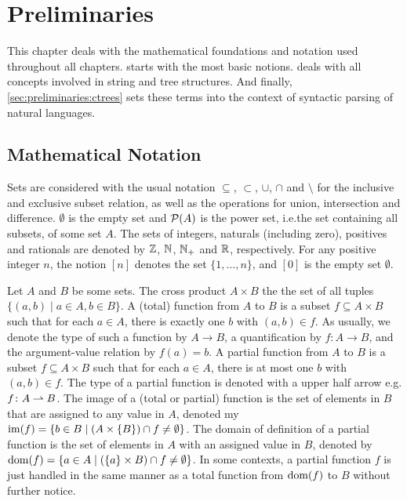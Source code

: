 \documentclass[../document.tex]{subfiles}
\begin{document}

    \chapter{Preliminaries}\label{chap:preliminaries}
    This chapter deals with the mathematical foundations and notation used throughout all chapters.
     starts with the most basic notions.
     deals with all concepts involved in string and tree structures.
    And finally, \cref{sec:preliminaries:ctrees} sets these terms into the context of syntactic parsing of natural languages.


    \section{Mathematical Notation}\label{sec:preliminaries:math}
    Sets are considered with the usual notation \(\subseteq\), \(\subset\), \(\cup\), \(\cap\) and \(\setminus\) for the inclusive and exclusive subset relation, as well as the operations for union, intersection and difference.
    \(\emptyset\) is the empty set and \(\mathcal{P}(A)\) is the power set, i.e.\@ the set containing all subsets, of some set \(A\).
    The sets of integers, naturals (including zero), positives and rationals are denoted by $\mathbb{Z}$, $\mathbb{N}$, $\mathbb{N}_+$ and $\mathbb{R}$, respectively.
    For any positive integer \(n\), the notion \([n]\) denotes the set \(\{1, \ldots, n\}\), and \([0]\) is the empty set \(\emptyset\).

    Let \(A\) and \(B\) be some sets.
    The cross product \(A \times B\) the the set of all tuples \(\{(a,b) \mid a \in A, b\in B\}\).
    A (total) function from \(A\) to \(B\) is a subset \(f \subseteq A \times B\) such that for each \(a \in A\), there is exactly one \(b\) with \((a,b) \in f\).
    As usually, we denote the type of such a function by \(A \to B\), a quantification by \(f\colon A \to B\), and the argument-value relation by \(f(a) = b\).
    A partial function from \(A\) to \(B\) is a subset \(f \subseteq A \times B\) such that for each \(a \in A\), there is at most one \(b\) with \((a,b) \in f\).
    The type of a partial function is denoted with a upper half arrow e.g. \(f\colon A \rightharpoonup B\).
    The image of a (total or partial) function is the set of elements in \(B\) that are assigned to any value in \(A\), denoted my \(\operatorname{im}(f) = \{b\in B \mid (A \times \{B\}) \cap f \neq \emptyset\}\).
    The domain of definition of a partial function is the set of elements in \(A\) with an assigned value in \(B\), denoted by \(\operatorname{dom}(f) = \{a\in A \mid (\{a\} \times B) \cap f \neq \emptyset\}\).
    In some contexts, a partial function \(f\) is just handled in the same manner as a total function from \(\operatorname{dom}(f)\) to \(B\) without further notice.
\end{document}
